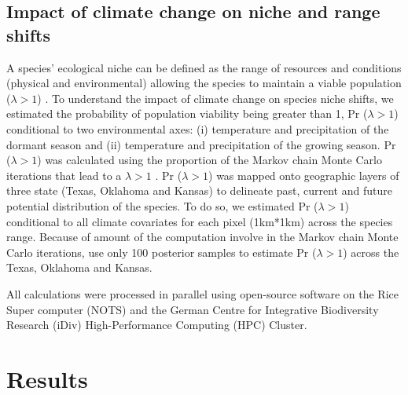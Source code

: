 \documentclass[12pt]{article}
\begin{document}
\subsection*{Impact of climate change on niche and range shifts}
A species' ecological niche can be defined as the range of resources and conditions (physical and environmental) allowing the species to maintain a viable population ($\lambda > 1$) \citep{maguire1973niche,hutchinson1978introduction}.
To understand the impact of climate change on species niche shifts, we estimated the probability of  population viability being greater than  1, Pr ($\lambda > 1$) conditional to two environmental axes: (i) temperature and precipitation of the dormant season and (ii) temperature and precipitation of the growing season. 
Pr ($\lambda > 1$) was calculated using the proportion of the Markov chain Monte Carlo iterations that lead to a $\lambda > 1$ \citep{diez2014probabilistic}.
Pr ($\lambda > 1$) was mapped onto geographic layers of three state (Texas, Oklahoma and Kansas) to delineate past, current and future potential distribution of the species.
To do so, we estimated Pr ($\lambda > 1$) conditional to all climate covariates for each pixel (1km*1km) across the species range. 
Because of amount of the computation involve in the Markov chain Monte Carlo iterations, use only 100 posterior samples to estimate Pr ($\lambda > 1$) across the Texas, Oklahoma and Kansas.

All calculations were processed in parallel using open-source software on the Rice Super computer (NOTS) and the German Centre for Integrative Biodiversity Research (iDiv) High-Performance Computing (HPC) Cluster.

\section*{Results}
\end{document}
